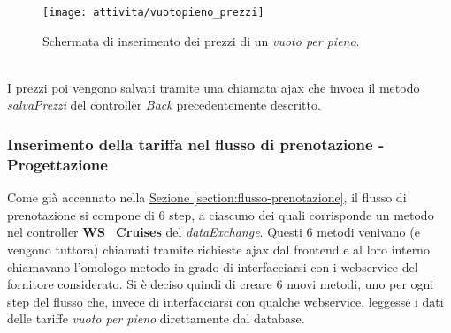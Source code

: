 	\begin{figure}[!h] 
	\centering 
	\texttt{[image: attivita/vuotopieno\_prezzi]} 
	\caption{Schermata di inserimento dei prezzi di un \textit{vuoto per pieno}.}
	\label{figura:inserimento-prezzi-vuotopieno}
\end{figure}\\
I prezzi poi vengono salvati tramite una chiamata \gls{ajax} che invoca il metodo \textit{salvaPrezzi} del controller \textit{Back} precedentemente descritto.

\subsubsection{Inserimento della tariffa nel flusso di prenotazione - Progettazione}
Come già accennato nella \hyperref[section:flusso-prenotazione]{Sezione \ref*{section:flusso-prenotazione}}, il flusso di prenotazione si compone di 6 step, a ciascuno dei quali corrisponde un metodo nel controller \textbf{WS\_Cruises} del \textit{dataExchange}. Questi 6 metodi venivano (e vengono tuttora) chiamati tramite richieste \gls{ajax} dal frontend e al loro interno chiamavano l'omologo metodo in grado di interfacciarsi con i \gls{webservice} del fornitore considerato. Si è deciso quindi di creare 6 nuovi metodi, uno per ogni step del flusso che, invece di interfacciarsi con qualche \gls{webservice}, leggesse i dati delle tariffe \textit{vuoto per pieno} direttamente dal database.\\
